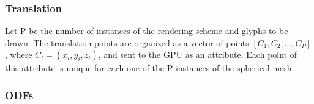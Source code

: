 \documentclass[twoside,twocolumn,10pt]{article}
\begin{document}



\subsubsection{Translation}
Let P be the number of instances of the rendering scheme and glyphs to be drawn. The translation points are organized as a vector of points $[C_1,C_2, \dots, C_P]$, where $C_i = (x_i, y_i, z_i)$, and sent to the GPU as an attribute. Each point of this attribute is unique for each one of the P instances of the spherical mesh.




\subsubsection{ODFs}
\end{document}
